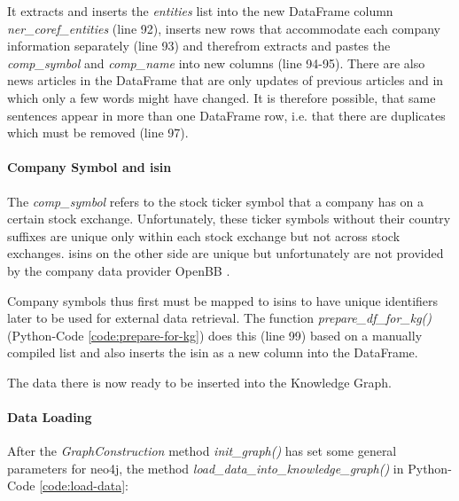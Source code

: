 It extracts and inserts the \emph{entities} list into the new DataFrame column \emph{ner\_coref\_entities} (line 92),
inserts new rows that accommodate each company information separately (line 93) and therefrom extracts and pastes the \emph{comp\_symbol} and \emph{comp\_name} into new columns (line 94-95).
There are also news articles in the DataFrame that are only updates of previous articles and in which only a few words might have changed.
It is therefore possible, that same sentences appear in more than one DataFrame row, i.e. that there are duplicates which must be removed (line 97).

\paragraph{Company Symbol and \gls{isin}}\label{par:symbol-isin}
The \emph{comp\_symbol} refers to the stock ticker symbol that a company has on a certain stock exchange.
Unfortunately, these ticker symbols without their country suffixes are unique only within each stock exchange but not across stock exchanges.
\glspl{isin} on the other side are unique but unfortunately are not provided by the company data provider OpenBB \cite{openbb}.

Company symbols thus first must be mapped to \glspl{isin} to have unique identifiers later to be used for external data retrieval.
The function \emph{prepare\_df\_for\_kg()} (Python-Code \ref{code:prepare-for-kg}) does this (line 99) based on a manually compiled list and also inserts the \gls{isin} as a new column into the DataFrame.

The data there is now ready to be inserted into the Knowledge Graph.

\paragraph{Data Loading}
After the \emph{GraphConstruction} method \emph{init\_graph()} has set some general parameters for neo4j,
the method \emph{load\_data\_into\_knowledge\_graph()} in Python-Code \ref{code:load-data}:


